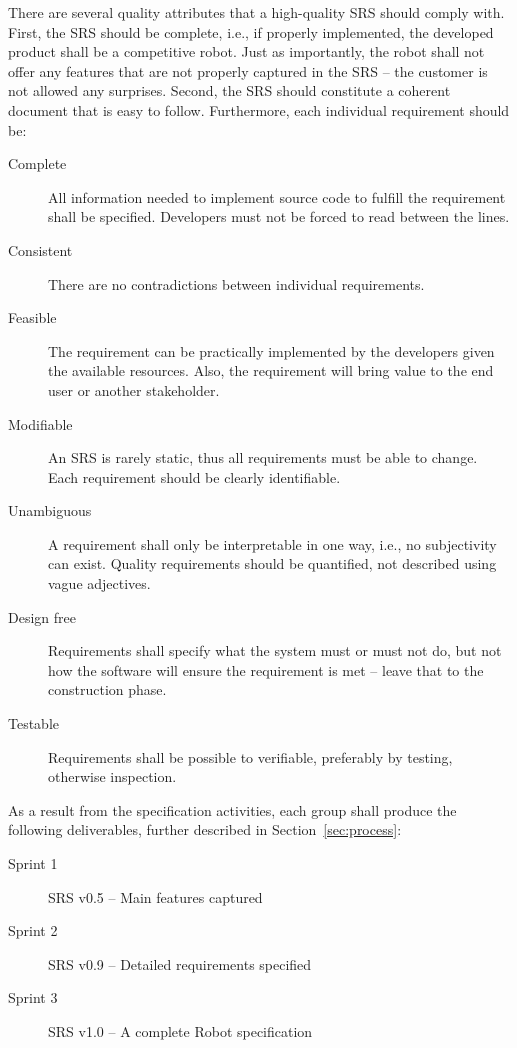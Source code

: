 \documentclass{scrreprt}
\begin{document}
There are several quality attributes that a high-quality SRS should comply with. First, the SRS should be complete, i.e., if properly implemented, the developed product shall be a competitive robot. Just as importantly, the robot shall not offer any features that are not properly captured in the SRS -- the customer is not allowed any surprises. Second, the SRS should constitute a coherent document that is easy to follow. Furthermore, each individual requirement should be:

\begin{description}
\item[Complete] All information needed to implement source code to fulfill the requirement shall be specified. Developers must not be forced to read between the lines.
\item[Consistent] There are no contradictions between individual requirements.
\item[Feasible] The requirement can be practically implemented by the developers given the available resources. Also, the requirement will bring value to the end user or another stakeholder.
\item[Modifiable] An SRS is rarely static, thus all requirements must be able to change. Each requirement should be clearly identifiable.
\item[Unambiguous] A requirement shall only be interpretable in one way, i.e., no subjectivity can exist. Quality requirements should be quantified, not described using vague adjectives.
\item[Design free] Requirements shall specify what the system must or must not do, but not how the software will ensure the requirement is met -- leave that to the construction phase.
\item[Testable] Requirements shall be possible to verifiable, preferably by testing, otherwise inspection. 
\end{description}

As a result from the specification activities, each group shall produce the following deliverables, further described in Section~\ref{sec:process}:
\begin{description}
\item[Sprint 1] SRS v0.5 -- Main features captured
\item[Sprint 2] SRS v0.9 -- Detailed requirements specified
\item[Sprint 3] SRS v1.0 -- A complete Robot specification
\end{description}
\end{document}
